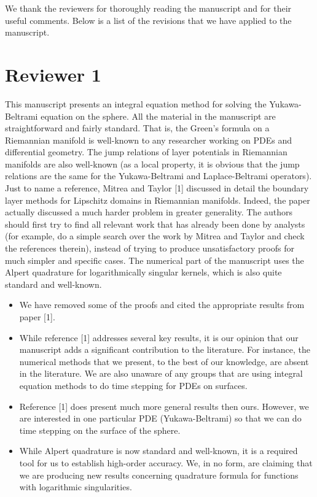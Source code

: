 \documentclass[11pt]{article}
\newcommand{\comment}[1]{{\color{blue} #1}}
\begin{document}
We thank the reviewers for thoroughly reading the manuscript and for
their useful comments.  Below is a list of the revisions that we have
applied to the manuscript.


\section*{Reviewer 1}

\comment{This manuscript presents an integral equation method for
solving the Yukawa-Beltrami equation on the sphere. All the material in
the manuscript are straightforward and fairly standard. That is, the
Green’s formula on a Riemannian manifold is well-known to any
researcher working on PDEs and differential geometry. The jump
relations of layer potentials in Riemannian manifolds are also
well-known (as a local property, it is obvious that the jump relations
are the same for the Yukawa-Beltrami and Laplace-Beltrami operators).
Just to name a reference, Mitrea and Taylor [1] discussed in detail the
boundary layer methods for Lipschitz domains in Riemannian manifolds.
Indeed, the paper actually discussed a much harder problem in greater
generality. The authors should first try to find all relevant work that
has already been done by analysts (for example, do a simple search over
the work by Mitrea and Taylor and check the references therein),
instead of trying to produce unsatisfactory proofs for much simpler and
specific cases. The numerical part of the manuscript uses the Alpert
quadrature for logarithmically singular kernels, which is also quite
standard and well-known.}
\begin{itemize}
  \item We have removed some of the proofs and cited the
  appropriate results from paper [1].
  \item While reference [1] addresses several key results, it is our
  opinion that our manuscript adds a significant contribution to the
  literature.  For instance, the numerical methods that we present, to
  the best of our knowledge, are absent in the literature.  We are also
  unaware of any groups that are using integral equation methods to do
  time stepping for PDEs on surfaces.
  \item Reference [1] does present much more general results then ours.
  However, we are interested in one particular PDE (Yukawa-Beltrami) so
  that we can do time stepping on the surface of the sphere.
  \item While Alpert quadrature is now standard and well-known, it is a
  required tool for us to establish high-order accuracy.  We, in no
  form, are claiming that we are producing new results concerning
  quadrature formula for functions with logarithmic singularities.
 \end{itemize}
\end{document}
